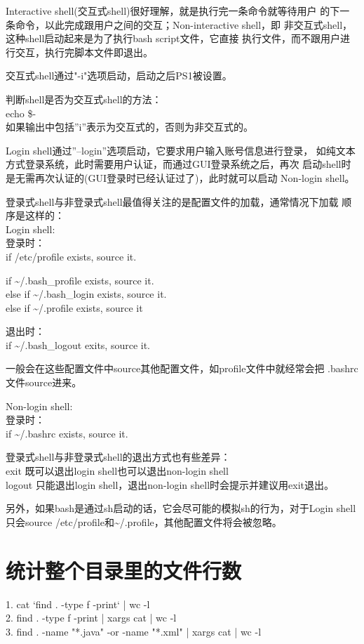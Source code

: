 ﻿\documentclass[a4paper,11pt]{article}
\begin{document}
  Interactive shell(交互式shell)很好理解，就是执行完一条命令就等待用户
  的下一条命令，以此完成跟用户之间的交互；Non-interactive shell，即
  非交互式shell，这种shell启动起来是为了执行bash script文件，它直接
  执行文件，而不跟用户进行交互，执行完脚本文件即退出。

  交互式shell通过"-i"选项启动，启动之后PS1被设置。

  判断shell是否为交互式shell的方法：\\
  echo \$-\\
  如果输出中包括''i''表示为交互式的，否则为非交互式的。

  Login shell通过''--login''选项启动，它要求用户输入账号信息进行登录，
  如纯文本方式登录系统，此时需要用户认证，而通过GUI登录系统之后，再次
  启动shell时是无需再次认证的(GUI登录时已经认证过了)，此时就可以启动
  Non-login shell。

  登录式shell与非登录式shell最值得关注的是配置文件的加载，通常情况下加载
  顺序是这样的：\\
  Login shell:\\
  登录时：\\
  if /etc/profile exists, source it.

  if \~{}/.bash\_profile exists, source it.\\
  else if \~{}/.bash\_login exists, source it.\\
  else if \~{}/.profile exists, source it

  退出时：\\
  if \~{}/.bash\_logout exits, source it.

  一般会在这些配置文件中source其他配置文件，如profile文件中就经常会把
  .bashrc文件source进来。

  Non-login shell:\\
  登录时：\\
  if \~{}/.bashrc exists, source it.

  登录式shell与非登录式shell的退出方式也有些差异：\\

  exit 既可以退出login shell也可以退出non-login shell\\
  logout 只能退出login shell，退出non-login shell时会提示并建议用exit退出。

  另外，如果bash是通过sh启动的话，它会尽可能的模拟sh的行为，对于Login shell
  只会source /etc/profile和\~{}/.profile，其他配置文件将会被忽略。


  \section[统计整个目录里的文件行数]{统计整个目录里的文件行数}
  1. cat `find . -type f -print` | wc -l\\
  2. find . -type f -print | xargs cat | wc -l\\
  3. find . -name "*.java" -or -name "*.xml" | xargs cat | wc -l
\end{document}
